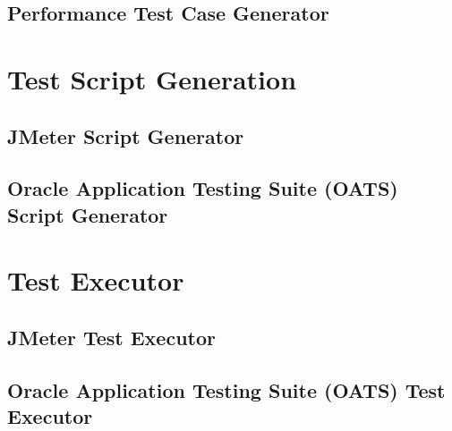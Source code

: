 

\subsection{Performance Test Case Generator}


\section{Test Script Generation}



\subsection{JMeter Script Generator}


\subsection{Oracle Application Testing Suite (OATS) Script Generator}


\section{Test Executor}



\subsection{JMeter Test Executor}


\subsection{Oracle Application Testing Suite (OATS) Test Executor}
